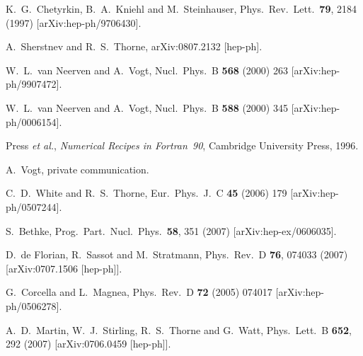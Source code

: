 \documentclass[12pt]{article}
\begin{document}
\begin{thebibliography}{99}
  K.~G.~Chetyrkin, B.~A.~Kniehl and M.~Steinhauser,
  Phys.\ Rev.\ Lett.\  {\bf 79}, 2184 (1997)
  [arXiv:hep-ph/9706430].

  A.~Sherstnev and R.~S.~Thorne,
  arXiv:0807.2132 [hep-ph].

  W.~L.~van Neerven and A.~Vogt,
  Nucl.\ Phys.\ B {\bf 568} (2000) 263
  [arXiv:hep-ph/9907472].

  W.~L.~van Neerven and A.~Vogt,
  Nucl.\ Phys.\ B {\bf 588} (2000) 345
  [arXiv:hep-ph/0006154].

  Press {\it et al.}, \emph{Numerical Recipes in Fortran~90},
  Cambridge University Press, 1996.
  
 A.~Vogt, private communication.


  C.~D.~White and R.~S.~Thorne,
  Eur.\ Phys.\ J.\ C {\bf 45} (2006) 179
  [arXiv:hep-ph/0507244].

  S.~Bethke,
  Prog.\ Part.\ Nucl.\ Phys.\  {\bf 58}, 351 (2007)
  [arXiv:hep-ex/0606035].

  D.~de Florian, R.~Sassot and M.~Stratmann,
  Phys.\ Rev.\  D {\bf 76}, 074033 (2007)
  [arXiv:0707.1506 [hep-ph]].


  G.~Corcella and L.~Magnea,
  Phys.\ Rev.\  D {\bf 72} (2005) 074017
  [arXiv:hep-ph/0506278].

  A.~D.~Martin, W.~J.~Stirling, R.~S.~Thorne and G.~Watt,
  Phys.\ Lett.\  B {\bf 652}, 292 (2007)
  [arXiv:0706.0459 [hep-ph]].


\end{thebibliography}
\end{document}
